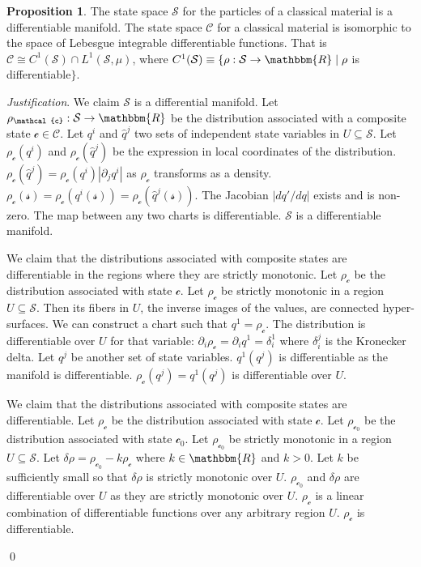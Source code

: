 \documentclass[aps,pra,10pt,twocolumn,floatfix,nofootinbib]{revtex4-1}
\numberwithin{equation}{section}
\theoremstyle{definition}
\newtheorem{prop}[equation]{Proposition}
\newenvironment{justification}{\emph{Justification}.}{\qed}
\begin{document}
\begin{prop}\label{prop:differentiable_manifold}
	The state space $\mathcal{S}$ for the particles of a  classical material is a differentiable manifold. The state space $\mathcal{C}$ for a classical material is isomorphic to the space of Lebesgue integrable differentiable functions. That is $\mathcal{C} \cong C^1(\mathcal{S}) \cap L^1(\mathcal{S}, \mu)$, where $C^1(\mathcal{S}) \equiv \{\rho:\mathcal{S} \rightarrow \mathbbm{R} \; | \; \rho$ is differentiable$\}$.
\end{prop}
\begin{justification}
	We claim $\mathcal{S}$ is a differential manifold. Let $\rho_\mathcal{c} : \mathcal{S} \rightarrow \mathbbm{R}$ be the distribution associated with a composite state $\mathcal{c} \in \mathcal{C}$. Let $q^i$ and $\hat{q}^j$ two sets of independent state variables in $U\subseteq \mathcal{S}$. Let $\rho_\mathcal{c}(q^i)$ and $\rho_\mathcal{c}(\hat{q}^j)$ be the expression in local coordinates of the distribution.  $\rho_\mathcal{c}(\hat{q}^j)=\rho_\mathcal{c}(q^i) | \partial_j q^i |$ as $\rho_\mathcal{c}$ transforms as a density. $\rho_\mathcal{c}(\mathcal{s}) = \rho_\mathcal{c}(q^i(\mathcal{s})) = \rho_\mathcal{c}(\hat{q}^j(\mathcal{s}))$. The Jacobian $| d q' / d q |$ exists and is non-zero. The map between any two charts is differentiable. $\mathcal{S}$ is a differentiable manifold.
	
	We claim that the distributions associated with composite states are differentiable in the regions where they are strictly monotonic. Let $\rho_\mathcal{c}$ be the distribution associated with state $\mathcal{c}$. Let $\rho_\mathcal{c}$ be strictly monotonic in a region $U\subseteq \mathcal{S}$. Then its fibers in $U$, the inverse images of the values, are connected hyper-surfaces. We can construct a chart such that $q^1=\rho_\mathcal{c}$. The distribution is differentiable over $U$ for that variable: $\partial_{i} \rho_\mathcal{c} = \partial_{i} q^1 = \delta_i^1$ where $\delta_i^j$ is the Kronecker delta. Let $q^{j}$ be another set of state variables. $q^1(q^{j})$ is differentiable as the manifold is differentiable. $\rho_\mathcal{c}(q^{j})=q^1(q^{j})$ is differentiable over $U$.
	
	We claim that the distributions associated with composite states are differentiable. Let $\rho_\mathcal{c}$ be the distribution associated with state $\mathcal{c}$. Let $\rho_{\mathcal{c}_0}$ be the distribution associated with state $\mathcal{c}_0$. Let $\rho_{\mathcal{c}_0}$ be strictly monotonic in a region $U\subseteq \mathcal{S}$. Let $\delta \rho = \rho_{\mathcal{c}_0} - k \rho_{\mathcal{c}}$ where $k \in \mathbbm{R}$ and $k>0$. Let $k$ be sufficiently small so that $\delta \rho$ is strictly monotonic over $U$. $\rho_{\mathcal{c}_0}$ and $\delta \rho$ are differentiable over $U$ as they are strictly monotonic over $U$. $\rho_{\mathcal{c}}$ is a linear combination of differentiable functions over any arbitrary region $U$. $\rho_{\mathcal{c}}$ is differentiable.
	

\end{justification}
\end{document}

